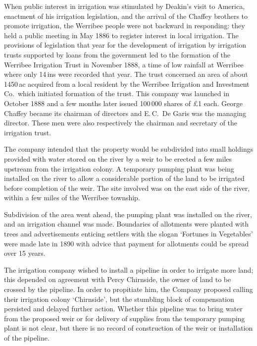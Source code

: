 When public interest in irrigation was stimulated by Deakin's visit to
America, enactment of his irrigation legislation, and the arrival of
the Chaffey brothers to promote irrigation, the Werribee people were
not backward in responding: they held a public meeting in May 1886 to
register interest in local irrigation.  The provisions of legislation
that year for the development of irrigation by irrigation trusts
supported by loans from the government led to the formation of the
Werribee Irrigation Trust in November 1888, a time of low rainfall at
Werribee where only 14\,ins were recorded that year.  The trust
concerned an area of about 1450\,ac acquired from a local resident by
the Werribee Irrigation and Investment Co.\ which initiated formation
of the trust.  This company was launched in October 1888 and a few
months later issued 100\,000 shares of \pounds1 each.  George Chaffey
became its chairman of directors and E.\,C.~De Garis was the managing
director.  These men were also respectively the chairman and secretary
of the irrigation trust.

The company intended that the property would be subdivided into small
holdings provided with water stored on the river by a weir to be
erected a few miles upstream from the irrigation colony.  A temporary
pumping plant was being installed on the river to allow a considerable
portion of the land to be irrigated before completion of the weir.
The site involved was on the east side of the river, within a few
miles of the Werribee township.

Subdivision of the area went ahead, the pumping plant was installed on
the river, and an irrigation channel was made.  Boundaries of
allotments were planted with trees and advertisements enticing
settlers with the slogan `Fortunes in Vegetables' were made late in
1890 with advice that payment for allotments could be spread over 15
years.

The irrigation company wished to install a pipeline in order to
irrigate more land; this depended on agreement with Percy Chirnside,
the owner of land to be crossed by the pipeline.  In order to
propitiate him, the Company proposed calling their irrigation colony
`Chirnside', but the stumbling block of compensation persisted and
delayed further action.  Whether this pipeline was to bring water from
the proposed weir or for delivery of supplies from the temporary
pumping plant is not clear, but there is no record of construction of
the weir or installation of the pipeline.

